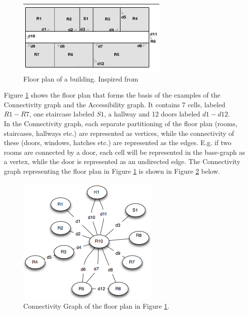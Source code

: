 \begin{figure}[H]%
\includegraphics[width=\columnwidth]{images/floorplan.png}%
\caption{Floor plan of a building. Inspired from~\cite{Jensen:2009:GMB:1590953.1591000}}%
\label{fig:floortplan}%
\end{figure}%

Figure \ref{fig:floortplan} shows the floor plan that forms the basis of the examples of the Connectivity graph and the Accessibility graph. 
It contains 7 cells, labeled $R1 - R7$, one staircase labeled $S1$, a hallway and 12 doors labeled $d1-d12$. \\

In the Connectivity graph, each separate partitioning of the floor plan (rooms, staircases, hallways etc.) are represented as vertices, while the connectivity of these (doors, windows, hatches etc.) are represented as the edges.
E.g. if two rooms are connected by a door, each cell will be represented in the base-graph as a vertex, while the door is represented as an undirected edge. 
The Connectivity graph representing the floor plan in Figure \ref{fig:floortplan} is shown in Figure \ref{fig:connectivitygraph} below. 

\begin{figure}[H]%
\includegraphics[width=\columnwidth]{images/connectivitygraph.png}%
\caption{Connectivity Graph of the floor plan in Figure \ref{fig:floortplan}.}%
\label{fig:connectivitygraph}%
\end{figure}%

